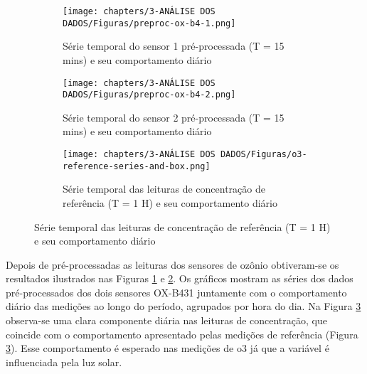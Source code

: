 \begin{figure}[h!]
    \centering
    \caption{Séries temporais dos sensores OX-B431 pré-processadas}
    \begin{subfigure}{0.9\textwidth}
        \texttt{[image: chapters/3-ANÁLISE DOS DADOS/Figuras/preproc-ox-b4-1.png]}
        \caption{Série temporal do sensor 1 pré-processada (T = 15 mins) e seu comportamento diário}
        \label{fig:data-o3-1-preproc-15}
    \end{subfigure}
    \begin{subfigure}{0.9\textwidth}
        \texttt{[image: chapters/3-ANÁLISE DOS DADOS/Figuras/preproc-ox-b4-2.png]}
        \caption{Série temporal do sensor 2 pré-processada (T = 15 mins) e seu comportamento diário}
        \label{fig:data-o3-2-preproc-15}
    \end{subfigure}
    \begin{subfigure}{0.9\textwidth}
        \texttt{[image: chapters/3-ANÁLISE DOS DADOS/Figuras/o3-reference-series-and-box.png]}
        \caption{Série temporal das leituras de concentração de referência (T = 1 H) e seu comportamento diário}
        \label{fig:data-o3-reference}
    \end{subfigure}
    \label{fig:data-o3-preproc-15}
\end{figure}

Depois de pré-processadas as leituras dos sensores de ozônio obtiveram-se os resultados ilustrados nas Figuras \ref{fig:data-o3-1-preproc-15} e \ref{fig:data-o3-2-preproc-15}. Os gráficos mostram as séries dos dados pré-processados dos dois sensores OX-B431 juntamente com o comportamento diário das medições ao longo do período, agrupados por hora do dia. Na Figura \ref{fig:data-o3-reference} observa-se uma clara componente diária nas leituras de concentração, que coincide com o comportamento apresentado pelas medições de referência (Figura \ref{fig:data-o3-reference}). Esse comportamento é esperado nas medições de \acrshort{o3} já que a variável é influenciada pela luz solar.

